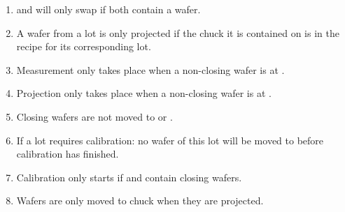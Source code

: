 \begin{enumerate}
    \item \chuckMeas and \chuckProj will only swap if both contain a wafer.
    \item A wafer from a lot is only projected if the chuck it is contained on is in the recipe for its corresponding lot.
    \item Measurement only takes place when a non-closing wafer is at \chuckMeas.
    \item Projection only takes place when a non-closing wafer is at \chuckProj.
    \item Closing wafers are not moved to \chuckOut or \tray.
    \item If a lot requires calibration: no wafer of this lot will be moved to \chuckMeas before calibration has finished.
    \item Calibration only starts if \chuckMeas and \chuckProj contain closing wafers.
    \item Wafers are only moved to chuck \chuckOut when they are projected.
\end{enumerate}